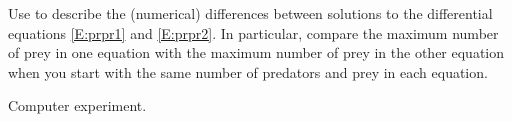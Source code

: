 \documentclass{ximera}
\begin{document}
\begin{computerExercise} \label{c9.1.7}
Use {\pplane} to describe the (numerical) differences between solutions 
to the differential equations \eqref{E:prpr1} and \eqref{E:prpr2}.  In particular,
compare the maximum number of prey in one equation with the maximum number of 
prey in the other equation when you start with the same number of predators 
and prey in each equation.

\begin{solution}
Computer experiment.


\end{solution}
\end{computerExercise}
\end{document}
